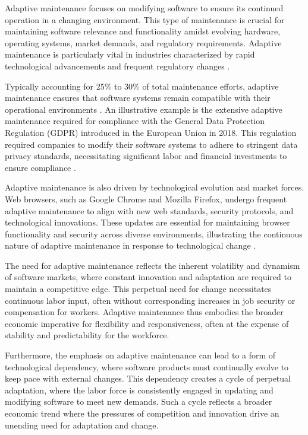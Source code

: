 \begin{refsection}
Adaptive maintenance focuses on modifying software to ensure its continued operation in a changing environment. This type of maintenance is crucial for maintaining software relevance and functionality amidst evolving hardware, operating systems, market demands, and regulatory requirements. Adaptive maintenance is particularly vital in industries characterized by rapid technological advancements and frequent regulatory changes \cite[pp.~109-111]{parnas1994software}.

Typically accounting for 25\% to 30\% of total maintenance efforts, adaptive maintenance ensures that software systems remain compatible with their operational environments \cite[pp.~221-223]{pigoski2008practical}. An illustrative example is the extensive adaptive maintenance required for compliance with the General Data Protection Regulation (GDPR) introduced in the European Union in 2018. This regulation required companies to modify their software systems to adhere to stringent data privacy standards, necessitating significant labor and financial investments to ensure compliance \cite[pp.~112-114]{pressman2019software}.

Adaptive maintenance is also driven by technological evolution and market forces. Web browsers, such as Google Chrome and Mozilla Firefox, undergo frequent adaptive maintenance to align with new web standards, security protocols, and technological innovations. These updates are essential for maintaining browser functionality and security across diverse environments, illustrating the continuous nature of adaptive maintenance in response to technological change \cite[pp.~49-51]{boehm1981software}.

The need for adaptive maintenance reflects the inherent volatility and dynamism of software markets, where constant innovation and adaptation are required to maintain a competitive edge. This perpetual need for change necessitates continuous labor input, often without corresponding increases in job security or compensation for workers. Adaptive maintenance thus embodies the broader economic imperative for flexibility and responsiveness, often at the expense of stability and predictability for the workforce.

Furthermore, the emphasis on adaptive maintenance can lead to a form of technological dependency, where software products must continually evolve to keep pace with external changes. This dependency creates a cycle of perpetual adaptation, where the labor force is consistently engaged in updating and modifying software to meet new demands. Such a cycle reflects a broader economic trend where the pressures of competition and innovation drive an unending need for adaptation and change.


\end{refsection}
